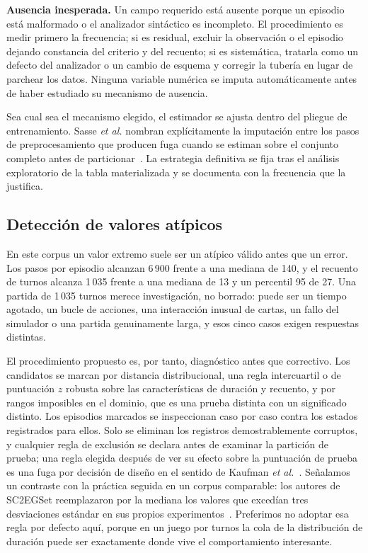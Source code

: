 \documentclass[conference]{IEEEtran}
\begin{document}
\textbf{Ausencia inesperada.} Un campo requerido est\'a ausente porque un
episodio est\'a malformado o el analizador sint\'actico es incompleto. El
procedimiento es medir primero la frecuencia; si es residual, excluir la
observaci\'on o el episodio dejando constancia del criterio y del recuento;
si es sistem\'atica, tratarla como un defecto del analizador o un cambio de
esquema y corregir la tuber\'ia en lugar de parchear los datos. Ninguna
variable num\'erica se imputa autom\'aticamente antes de haber estudiado su
mecanismo de ausencia.

Sea cual sea el mecanismo elegido, el estimador se ajusta dentro del pliegue
de entrenamiento. Sasse \textit{et al.} nombran expl\'icitamente la
imputaci\'on entre los pasos de preprocesamiento que producen fuga cuando se
estiman sobre el conjunto completo antes de
particionar~\cite{sasse_leakage_2025}. La estrategia definitiva se fija tras
el an\'alisis exploratorio de la tabla materializada y se documenta con la
frecuencia que la justifica.

\subsection{Detecci\'on de valores at\'ipicos}
\label{subsec:outliers}

En este corpus un valor extremo suele ser un at\'ipico v\'alido antes que un
error. Los pasos por episodio alcanzan 6\,900 frente a una mediana de 140, y
el recuento de turnos alcanza 1\,035 frente a una mediana de 13 y un
percentil 95 de 27. Una partida de 1\,035 turnos merece investigaci\'on, no
borrado: puede ser un tiempo agotado, un bucle de acciones, una interacci\'on
inusual de cartas, un fallo del simulador o una partida genuinamente larga, y
esos cinco casos exigen respuestas distintas.

El procedimiento propuesto es, por tanto, diagn\'ostico antes que
correctivo. Los candidatos se marcan por distancia distribucional, una
regla intercuartil o de puntuaci\'on $z$ robusta sobre las caracter\'isticas
de duraci\'on y recuento, y por rangos imposibles en el dominio, que es
una prueba distinta con un significado distinto. Los episodios marcados se
inspeccionan caso por caso contra los estados registrados para ellos. Solo se
eliminan los registros demostrablemente corruptos, y cualquier regla de
exclusi\'on se declara antes de examinar la partici\'on de prueba; una regla
elegida despu\'es de ver su efecto sobre la puntuaci\'on de prueba es una
fuga por decisi\'on de dise\~no en el sentido de Kaufman \textit{et
al.}~\cite{kaufman_leakage_2011}. Se\~nalamos un contraste con la
pr\'actica seguida en un corpus comparable: los autores de SC2EGSet
reemplazaron por la mediana los valores que exced\'ian tres desviaciones
est\'andar en sus propios experimentos~\cite{bialecki_sc2egset_2023}.
Preferimos no adoptar esa regla por defecto aqu\'i, porque en un juego por
turnos la cola de la distribuci\'on de duraci\'on puede ser exactamente
donde vive el comportamiento interesante.
\end{document}
